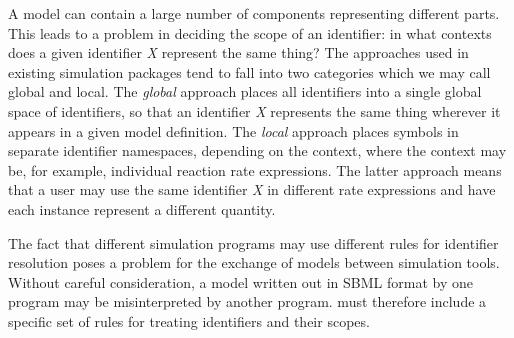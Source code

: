 A model can contain a large number of components representing
different parts.  This leads to a problem in deciding the scope of
an identifier: in what contexts does a given identifier \emph{X}
represent the same thing?  The approaches used in existing
simulation packages tend to fall into two categories which we may
call global and local.  The \emph{global} approach places all
identifiers into a single global space of identifiers, so that an
identifier \emph{X} represents the same thing wherever it appears
in a given model definition.  The \emph{local} approach places
symbols in separate identifier namespaces, depending on the
context, where the context may be, for example, individual
reaction rate expressions.  The latter approach means that a user
may use the same identifier \emph{X} in different rate expressions
and have each instance represent a different quantity.

The fact that different simulation programs may use different
rules for identifier resolution poses a problem for the exchange
of models between simulation tools.  Without careful
consideration, a model written out in SBML format by one program
may be misinterpreted by another program.  \sbmltwo must therefore
include a specific set of rules for treating identifiers and their
scopes.

